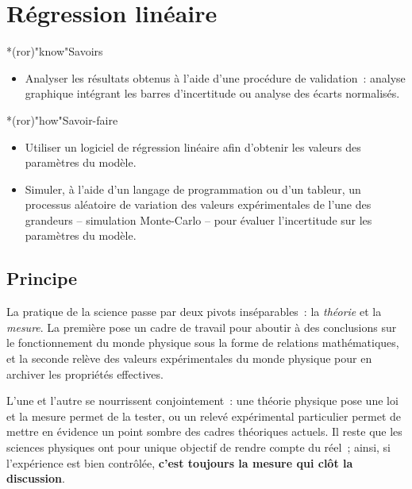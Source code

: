 \documentclass[a4paper, 12pt, garamond]{book}
\begin{document}
\setcounter{chapter}{3}

\chapter{Régression linéaire}

\vfill

\begin{prgm}
	\begin{tcb}*(ror)"know"{Savoirs}
		\begin{itemize}[label=$\diamond$, leftmargin=10pt]
			\item Analyser les résultats obtenus à l'aide d'une procédure de
			      validation~: analyse graphique intégrant les barres d'incertitude ou
			      analyse des écarts normalisés.
		\end{itemize}
	\end{tcb}

	\begin{tcb}*(ror)"how"{Savoir-faire}
		\begin{itemize}[label=$\diamond$, leftmargin=10pt]
			\item Utiliser un logiciel de régression linéaire afin d'obtenir les
			      valeurs des paramètres du modèle.

			\item Simuler, à l'aide d'un langage de programmation ou d'un tableur, un
			      processus aléatoire de variation des valeurs expérimentales de l'une des
			      grandeurs – simulation Monte-Carlo – pour évaluer l'incertitude sur les
			      paramètres du modèle.
		\end{itemize}
	\end{tcb}
\end{prgm}

\vfill
\minitoc
\vfill

\newpage

\section{Principe}

La pratique de la science passe par deux pivots inséparables~: la
\textit{théorie} et la \textit{mesure}. La première pose un cadre de travail
pour aboutir à des conclusions sur le fonctionnement du monde physique sous la
forme de relations mathématiques, et la seconde relève des valeurs
expérimentales du monde physique pour en archiver les propriétés effectives.

L'une et l'autre se nourrissent conjointement~: une théorie physique pose une
loi et la mesure permet de la tester, ou un relevé expérimental particulier
permet de mettre en évidence un point sombre des cadres théoriques actuels. Il
reste que les sciences physiques ont pour unique objectif de rendre compte du
réel~; ainsi, si l'expérience est bien contrôlée, \textbf{c'est toujours la
	mesure qui clôt la discussion}.
\end{document}
